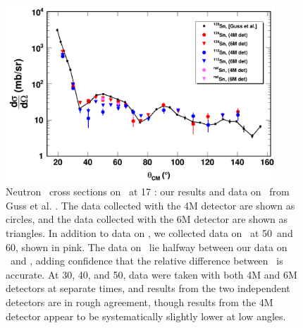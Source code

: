 \begin{figure}[tb]
    \centering
    \includegraphics[width = 0.9\textwidth]{figures/ECSResults2018.png}
    \caption[Neutron \el\ on \snTwelveFour\ at 17 \mega\electronvolt: our results and
    literature data]
    {
        Neutron \el\ cross sections on \snTwelveFour\ at 17
        \mega\electronvolt: our results and data on \snTwenty\ from Guss et al.
        \cite{Guss1989}. The data collected with the 4M detector
        are shown as circles, and the data collected
        with the 6M detector are shown as triangles. In addition to data on
        \snTwelveFour, we collected data on \snNat\ at 50\textdegree\ and
        60\textdegree, shown in pink. The data on \snNat\ lie halfway between our data on
        \snTwelve\ and \snFour, adding confidence that the relative difference
        between \snTwelveFour\ is accurate. At 30\textdegree,
        40\textdegree, and 50\textdegree, data were taken with both 4M
        and 6M detectors at separate times, and results from the two independent
        detectors are in rough agreement, though results from the 4M detector appear
        to be systematically slightly lower at low angles.
    }
    \label{SnECS_17MeV}
\end{figure}

\afterpage{\clearpage}
